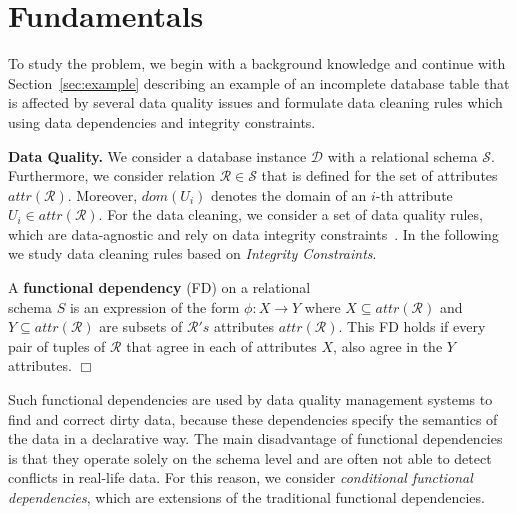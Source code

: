 \section{Fundamentals}
\label{sec:expl}

To study the problem, we begin with a background knowledge and continue with Section~\ref{sec:example} describing an example of an incomplete database table that is affected by several data quality issues and formulate data cleaning rules which using data dependencies and integrity constraints.



\textbf{Data Quality.} We consider a database instance $\mathcal{D}$ with a relational schema $\mathcal{S}$. 
Furthermore, we consider relation $\mathcal{R} \in \mathcal{S}$ 
that is defined for the set of attributes $attr(\mathcal{R})$. 
Moreover, $dom(U_i)$ denotes the domain of an $i$-th attribute $U_i \in attr(\mathcal{R})$. 
For the data 
cleaning, we consider a set of data quality rules, which are data-agnostic and rely on data integrity 
constraints~\cite{AbiteboulHV95}. In the following we study data cleaning rules based on 
\emph{Integrity Constraints}.

\vspace{-1em}
\begin{definition}
A \textbf{functional dependency} (FD) on a relational \\schema $S$ is an expression of the 
form $\phi: X \rightarrow Y$ where 
  $X \subseteq attr(\mathcal{R}) $ and $Y \subseteq attr(\mathcal{R}) $ 
are subsets of $\mathcal{R}'s$ attributes $attr(\mathcal{R})$. This FD holds if every pair of tuples of $\mathcal{R}$ that agree in each of attributes $X$, also agree in the $Y$ attributes. $\Box$ 
\end{definition}
\vspace{-2em}

Such functional dependencies are used by data quality management systems 
to find and correct dirty data, because these dependencies 
specify the semantics of the data in a declarative way.
The main disadvantage of functional dependencies is that they operate solely on the schema level 
and are often not able to detect
conflicts in real-life data. For this reason, we consider 
\emph{conditional functional dependencies}, which are extensions of the 
traditional functional dependencies.

